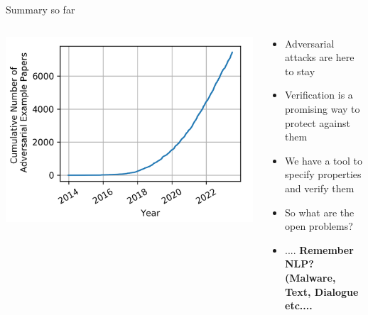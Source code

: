 \documentclass[t,compress,aspectratio=169]{beamer}
\begin{document}
\begin{frame}{Summary so far}

\begin{columns}
\begin{column}{0.3\textwidth}

\centering\includegraphics[width=1.3\textwidth]{img/amount-of-papers.png}
   
\end{column}
\begin{column}{0.60\textwidth}  %
    \begin{itemize}
       \item Adversarial attacks are here to stay
       \item Verification is a promising way to protect against them
       \item We have a tool to specify properties and verify them
       \item So what are the open problems?
       \item .... \textbf{Remember NLP? (Malware, Text, Dialogue etc....}
   \end{itemize}
\end{column}
\end{columns}
\end{frame}



\end{document}
